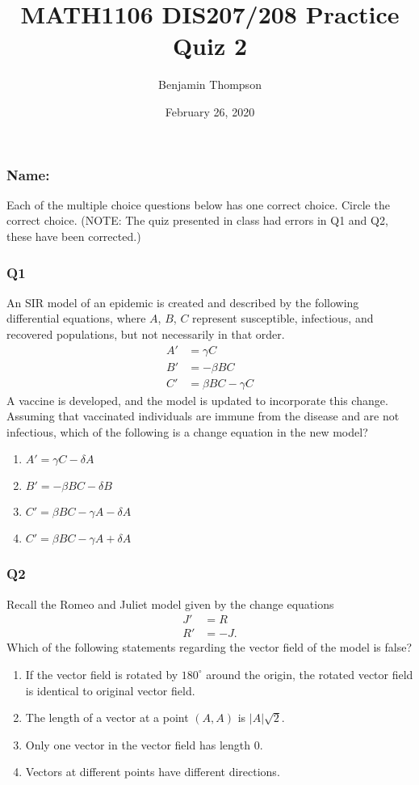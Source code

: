 \documentclass[12pt,a4paper]{article}
\title{MATH1106 DIS207/208 Practice Quiz 2}
\author{Benjamin Thompson}
\date{February 26, 2020}
\begin{document}
\subsubsection*{Name:}
Each of the multiple choice questions below has one correct choice. Circle the correct choice. (NOTE: The quiz presented in class had errors in Q1 and Q2, these have been corrected.)
\subsubsection*{Q1}
An SIR model of an epidemic is created and described by the following differential equations, where $A$, $B$, $C$ represent susceptible, infectious, and recovered populations, but not necessarily in that order.
\begin{align*}
A' &= \gamma C \\
B' &= -\beta BC  \\
C' &= \beta BC - \gamma C
\end{align*}
A vaccine is developed, and the model is updated to incorporate this change. Assuming that vaccinated individuals are immune from the disease and are not infectious, which of the following is a change equation in the new model?

\begin{enumerate}[label=(\alph*)]
\item $A' = \gamma C - \delta A$
\item $B' = -\beta BC - \delta B$
\item $C' = \beta BC - \gamma A - \delta A$
\item $C' = \beta BC - \gamma A + \delta A$
\end{enumerate}

\subsubsection*{Q2}
Recall the Romeo and Juliet model given by the change equations
\begin{align*}
	J' &= R \\
	R' &= -J.
\end{align*}
Which of the following statements regarding the vector field of the model is false?
\begin{enumerate}[label=(\alph*)]
\item If the vector field is rotated by $180^{\circ}$ around the origin, the rotated vector field is identical to original vector field.
\item The length of a vector at a point $(A,A)$ is $|A|\sqrt{2}$.
\item Only one vector in the vector field has length $0$.
\item Vectors at different points have different directions.
\end{enumerate}
\end{document}
